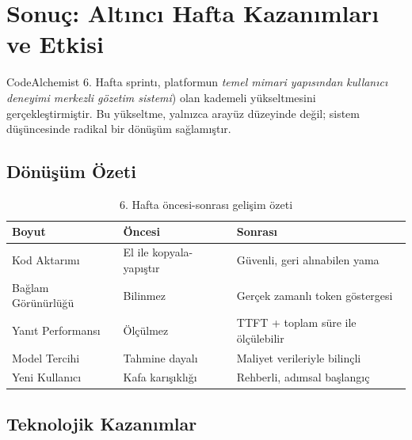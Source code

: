 \documentclass[12pt,a4paper]{article}
\begin{document}
\section*{Sonuç: Altıncı Hafta Kazanımları ve Etkisi}

CodeAlchemist 6. Hafta sprintı, platformun \textit{temel mimari yapısından} \textit{kullanıcı deneyimi merkezli gözetim sistemi}) olan kademeli yükseltmesini gerçekleştirmiştir. Bu yükseltme, yalnızca arayüz düzeyinde değil; sistem düşüncesinde radikal bir dönüşüm sağlamıştır.

\subsection*{Dönüşüm Özeti}

\begin{table}[h!]
  \centering\small
  \begin{tabular}{@{} P{3cm} P{3cm} P{3cm} @{}}
    \toprule
    \textbf{Boyut} & \textbf{Öncesi} & \textbf{Sonrası} \\
    \midrule
    Kod Aktarımı & El ile kopyala-yapıştır & Güvenli, geri alınabilen yama \\
    Bağlam Görünürlüğü & Bilinmez & Gerçek zamanlı token göstergesi \\
    Yanıt Performansı & Ölçülmez & TTFT + toplam süre ile ölçülebilir \\
    Model Tercihi & Tahmine dayalı & Maliyet verileriyle bilinçli \\
    Yeni Kullanıcı & Kafa karışıklığı & Rehberli, adımsal başlangıç \\
    \bottomrule
  \end{tabular}
  \caption{6. Hafta öncesi-sonrası gelişim özeti}
\end{table}

\subsection*{Teknolojik Kazanımlar}
\end{document}
